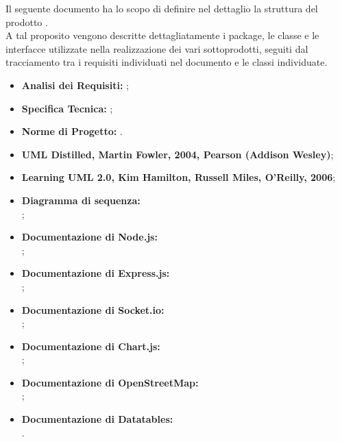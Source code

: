 
		Il seguente documento ha lo scopo di definire nel dettaglio la struttura del prodotto \groupname{}. \\ A tal proposito vengono descritte dettagliatamente i package, le classe e le interfacce utilizzate nella realizzazione dei vari sottoprodotti, seguiti dal tracciamento tra i requisiti individuati nel documento  e le classi individuate.

	


			\begin{itemize}
				\item \textbf{Analisi dei Requisiti:} ;
				\item \textbf{Specifica Tecnica:} ;
				\item \textbf{Norme di Progetto:} .
			\end{itemize}
			\begin{itemize}
				\item \textbf{UML Distilled, Martin Fowler, 2004, Pearson (Addison Wesley)};
				\item \textbf{Learning UML 2.0, Kim Hamilton, Russell Miles, O'Reilly, 2006};
				\item \textbf{Diagramma di sequenza:} \\ 
				;
				\item \textbf{Documentazione di Node.js:} \\
				;
				\item \textbf{Documentazione di Express.js:} \\
				;
				\item \textbf{Documentazione di Socket.io:} \\
				;
				\item \textbf{Documentazione di Chart.js:} \\
				;
				\item \textbf{Documentazione di OpenStreetMap:} \\
				;
				\item \textbf{Documentazione di Datatables:} \\
				.
			\end{itemize}